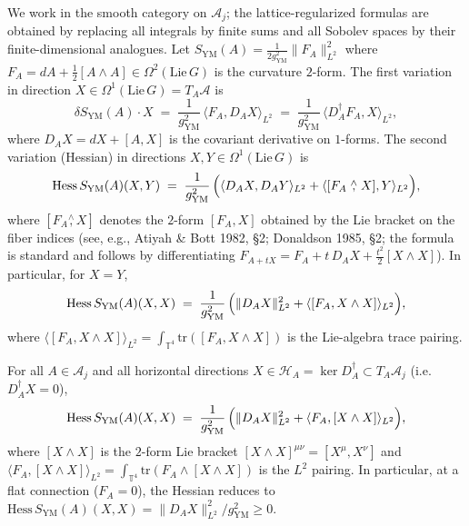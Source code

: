 We work in the smooth category on $\mathcal{A}_{j}$; the
lattice-regularized formulas are obtained by replacing all
integrals by finite sums and all Sobolev spaces by their
finite-dimensional analogues. Let
$S_{\mathrm{YM}}(A)=\tfrac{1}{2g_{\mathrm{YM}}^{2}}\|F_{A}\|
_{L^{2}}^{2}$ where
$F_{A}=dA+\tfrac{1}{2}[A\wedge A]\in\Omega^{2}(\mathrm{Lie}\,G)$
is the curvature $2$-form. The first variation in direction
$X\in\Omega^{1}(\mathrm{Lie}\,G)=T_{A}\mathcal{A}$ is
\begin{equation}
\label{eq:ym_first_variation}
  \delta S_{\mathrm{YM}}(A)\cdot X
  \;=\;\frac{1}{g_{\mathrm{YM}}^{2}}\,
  \langle F_{A},D_{A}X\rangle_{L^{2}}
  \;=\;\frac{1}{g_{\mathrm{YM}}^{2}}\,
  \langle D_{A}^{\dagger}F_{A},X\rangle_{L^{2}},
\end{equation}
where $D_{A}X=dX+[A,X]$ is the covariant derivative on
$1$-forms. The second variation (Hessian) in directions
$X,Y\in\Omega^{1}(\mathrm{Lie}\,G)$ is
\begin{equation}
\label{eq:ym_hessian_full}
  \mathrm{Hess}\,S_{\mathrm{YM}}(A)(X,Y)
  \;=\;\frac{1}{g_{\mathrm{YM}}^{2}}\,
  \Bigl(\langle D_{A}X,D_{A}Y\rangle_{L^{2}}
  +\langle [F_{A}\stackrel{\wedge}{,}X],Y\rangle_{L^{2}}\Bigr),
\end{equation}
where $[F_{A}\stackrel{\wedge}{,}X]$ denotes the $2$-form
$[F_{A},X]$ obtained by the Lie bracket on the fiber indices
(see, e.g., Atiyah \& Bott 1982, \S 2; Donaldson 1985, \S 2;
the formula is standard and follows by differentiating
$F_{A+tX}=F_{A}+t\,D_{A}X+\tfrac{t^{2}}{2}[X\wedge X]$). In
particular, for $X=Y$,
\begin{equation}
\label{eq:ym_hessian_diagonal}
  \mathrm{Hess}\,S_{\mathrm{YM}}(A)(X,X)
  \;=\;\frac{1}{g_{\mathrm{YM}}^{2}}\,
  \Bigl(\|D_{A}X\|_{L^{2}}^{2}
  +\langle [F_{A},X\wedge X]\rangle_{L^{2}}\Bigr),
\end{equation}
where $\langle[F_{A},X\wedge X]\rangle_{L^{2}}=
\int_{\mathbb{T}^{4}}\mathrm{tr}([F_{A},X\wedge X])$ is the
Lie-algebra trace pairing.

\begin{lemma}
\label{lem:ym_hessian_horizontal}
For all $A\in\mathcal{A}_{j}$ and all horizontal directions
$X\in\mathcal{H}_{A}=\ker D_{A}^{\dagger}\subset
T_{A}\mathcal{A}_{j}$ (i.e.\ $D_{A}^{\dagger}X=0$),
\begin{equation}
\label{eq:ym_hessian_horizontal}
  \mathrm{Hess}\,S_{\mathrm{YM}}(A)(X,X)
  \;=\;\frac{1}{g_{\mathrm{YM}}^{2}}\,
  \Bigl(\|D_{A}X\|_{L^{2}}^{2}
  +\langle F_{A},[X\wedge X]\rangle_{L^{2}}\Bigr),
\end{equation}
where $[X\wedge X]$ is the $2$-form Lie bracket
$[X\wedge X]^{\mu\nu}=[X^{\mu},X^{\nu}]$ and
$\langle F_{A},[X\wedge X]\rangle_{L^{2}}=
\int_{\mathbb{T}^{4}}\mathrm{tr}(F_{A}\wedge[X\wedge X])$ is
the $L^{2}$ pairing. In particular, at a flat connection
($F_{A}=0$), the Hessian reduces to
$\mathrm{Hess}\,S_{\mathrm{YM}}(A)(X,X)=
\|D_{A}X\|_{L^{2}}^{2}/g_{\mathrm{YM}}^{2}\ge 0$.
\end{lemma}

